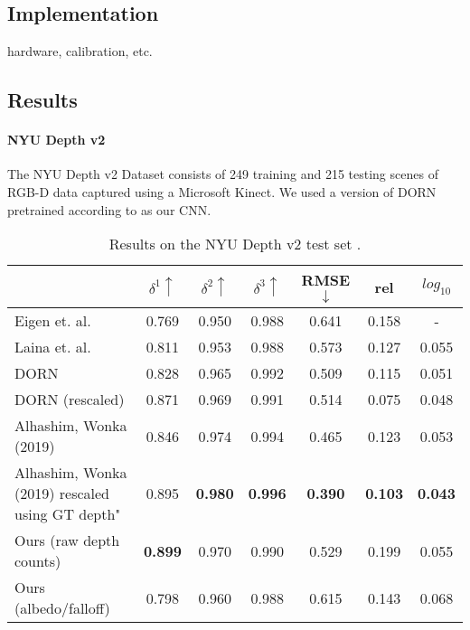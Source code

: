 \subsection{Implementation} 

hardware, calibration, etc.

\subsection{Results} 
\paragraph{NYU Depth v2}
The NYU Depth v2 Dataset consists of 249 training and 215 testing scenes of
RGB-D data captured using a Microsoft Kinect. We used a version of DORN
pretrained according to \cite{Fu. et al} as our CNN.
\newpage
\begin{table*}
\begin{center}
\begin{tabular}{lccc|ccc}
  \toprule
    & $\delta^1 \uparrow$ & $\delta^2\uparrow$ & $\delta^3 \uparrow$ & RMSE $\downarrow$ & rel & $log_{10}$ \\
  \midrule
Eigen et. al. & 0.769 & 0.950 & 0.988 & 0.641 & 0.158 & - \\ 
Laina et. al.&0.811&0.953&0.988&0.573&0.127&0.055 \\
DORN&0.828&0.965&0.992&0.509&0.115&0.051 \\
  DORN (rescaled) & 0.871 & 0.969 & 0.991 & 0.514 & 0.075 & 0.048 \\
Alhashim, Wonka (2019)&0.846&0.974&0.994&0.465&0.123&0.053 \\
Alhashim, Wonka (2019) rescaled using GT depth"&0.895&\textbf{0.980}&\textbf{0.996}&\textbf{0.390}&\textbf{0.103}&\textbf{0.043} \\
  \midrule
  Ours (raw depth counts) & \textbf{0.899} & 0.970 & 0.990 & 0.529 & 0.199 & 0.055 \\
  Ours (albedo/falloff) & 0.798 & 0.960 & 0.988 & 0.615 & 0.143 & 0.068 \\
  \bottomrule
\end{tabular} 
\end{center}
\caption{Results on the NYU Depth v2 test set \cite{nyudepth}.}
\end{table*}

